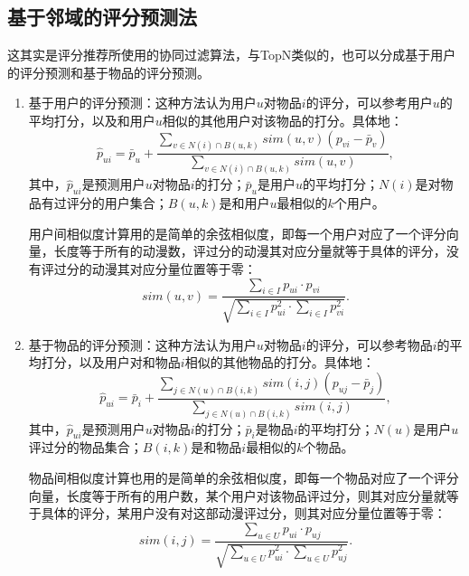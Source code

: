 \subsection{基于邻域的评分预测法}
这其实是评分推荐所使用的协同过滤算法，与TopN类似的，也可以分成基于用户的评分预测和基于物品的评分预测。
\begin{enumerate}
	\item 基于用户的评分预测：这种方法认为用户$u$对物品$i$的评分，可以参考用户$u$的平均打分，以及和用户$u$相似的其他用户对该物品的打分。具体地：
	\begin{equation}
	\hat{p}_{ui}=\bar{p}_u+\frac{\sum\limits_{v\in N(i)\cap B(u,k)}sim(u,v)(p_{vi}-\bar{p}_v)}{\sum\limits_{v\in N(i)\cap B(u,k)}sim(u,v)},
	\end{equation}
	其中，$\hat{p}_{ui}$是预测用户$u$对物品$i$的打分；$\bar{p}_u$是用户$u$的平均打分；$N(i)$是对物品有过评分的用户集合；$B(u,k)$是和用户$u$最相似的$k$个用户。
	
	用户间相似度计算用的是简单的余弦相似度，即每一个用户对应了一个评分向量，长度等于所有的动漫数，评过分的动漫其对应分量就等于具体的评分，没有评过分的动漫其对应分量位置等于零：
	\begin{equation}
	sim(u,v)=\frac{\sum\limits_{i\in I}p_{ui}\cdot p_{vi}}{\sqrt{\sum\limits_{i\in I}p_{ui}^2\cdot \sum\limits_{i\in I}p_{vi}^2}}.
	\end{equation}
	
	\item 基于物品的评分预测\cite{sarwar2001item}：这种方法认为用户$u$对物品$i$的评分，可以参考物品$i$的平均打分，以及用户对和物品$i$相似的其他物品的打分。具体地：
	\begin{equation}
	\hat{p}_{ui}=\bar{p}_i+\frac{\sum\limits_{j\in N(u)\cap B(i,k)}sim(i,j)(p_{uj}-\bar{p}_j)}{\sum\limits_{j\in N(u)\cap B(i,k)}sim(i,j)},
	\end{equation}
	其中，$\hat{p}_{ui}$是预测用户$u$对物品$i$的打分；$\bar{p}_i$是物品$i$的平均打分；$N(u)$是用户$u$评过分的物品集合；$B(i,k)$是和物品$i$最相似的$k$个物品。
	
	物品间相似度计算也用的是简单的余弦相似度，即每一个物品对应了一个评分向量，长度等于所有的用户数，某个用户对该物品评过分，则其对应分量就等于具体的评分，某用户没有对这部动漫评过分，则其对应分量位置等于零：
	\begin{equation}
	sim(i,j)=\frac{\sum\limits_{u\in U}p_{ui}\cdot p_{uj}}{\sqrt{\sum\limits_{u\in U}p_{ui}^2\cdot \sum\limits_{u\in U}p_{uj}^2}}.
	\end{equation}
\end{enumerate}

